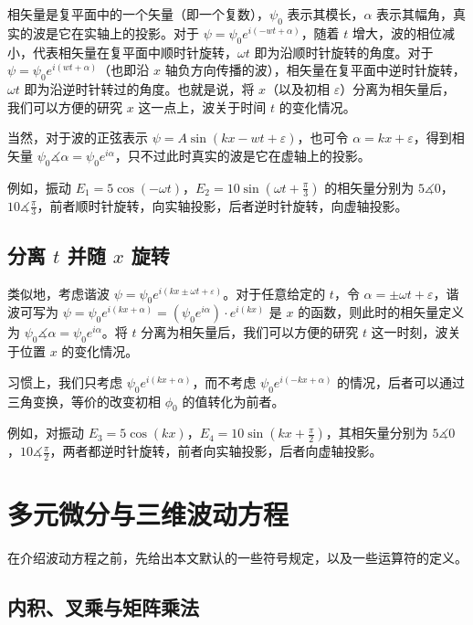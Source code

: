 \documentclass[UTF8]{report}
\theoremstyle{MyLineTheoremStyle} %
\theoremstyle{MyBlockTheoremStyle} %
\theoremstyle{MySubsubsectionStyle} %
\begin{document}
相矢量是复平面中的一个矢量（即一个复数），$\psi_0$ 表示其模长，$\alpha$ 表示其幅角，真实的波是它在实轴上的投影。对于 $\psi = \psi_0 e^{i(- wt + \alpha)} $，随着 $t$ 增大，波的相位减小，代表相矢量在复平面中顺时针旋转，$\omega t$ 即为沿顺时针旋转的角度。对于 $\psi = \psi_0 e^{i( wt + \alpha)}$（也即沿 $x$ 轴负方向传播的波），相矢量在复平面中逆时针旋转，$\omega t$ 即为沿逆时针转过的角度。也就是说，将 $x$（以及初相 $\varepsilon$）分离为相矢量后，我们可以方便的研究 $x$ 这一点上，波关于时间 $t$ 的变化情况。

当然，对于波的正弦表示 $\psi = A \sin (kx - wt + \varepsilon)$，也可令  $\alpha = kx + \varepsilon$，得到相矢量 $\psi_0 \measuredangle \alpha = \psi_0 e^{i \alpha}$，只不过此时真实的波是它在虚轴上的投影。

例如，振动 $E_1 = 5 \cos (-\omega t)$，$E_2 = 10 \sin (\omega t + \frac{\pi}{3} )$ 的相矢量分别为 $5 \measuredangle 0$，$10 \measuredangle \frac{\pi}{3} $，前者顺时针旋转，向实轴投影，后者逆时针旋转，向虚轴投影。

\subsection{分离 $t$ 并随 $x$ 旋转}

类似地，考虑谐波 $\psi = \psi_0 e^{i(kx \pm \omega t + \varepsilon)}$。对于任意给定的 $t$，令 $\alpha = \pm \omega t + \varepsilon$，谐波可写为 $\psi = \psi_0 e^{i(kx + \alpha)} = (\psi_0 e^{i \alpha})\cdot e^{i(kx)} $ 是 $x$ 的函数，则此时的相矢量定义为 $ \psi_0 \measuredangle \alpha = \psi_0 e^{i \alpha}$。将 $t$ 分离为相矢量后，我们可以方便的研究 $t$ 这一时刻，波关于位置 $x$ 的变化情况。

习惯上，我们只考虑 $\psi_0 e^{i(kx + \alpha)}$，而不考虑 $\psi_0 e^{i(-kx + \alpha)}$ 的情况，后者可以通过三角变换，等价的改变初相 $\phi_0$ 的值转化为前者。 

例如，对振动 $E_3 = 5 \cos (kx)$，$E_4 = 10 \sin (kx + \frac{\pi}{2} )$，其相矢量分别为 $5 \measuredangle 0$，$10 \measuredangle \frac{\pi}{2} $，两者都逆时针旋转，前者向实轴投影，后者向虚轴投影。



\section{多元微分与三维波动方程}\label{波动方程}

在介绍波动方程之前，先给出本文默认的一些符号规定，以及一些运算符的定义。

\subsection{内积、叉乘与矩阵乘法}
\end{document}
